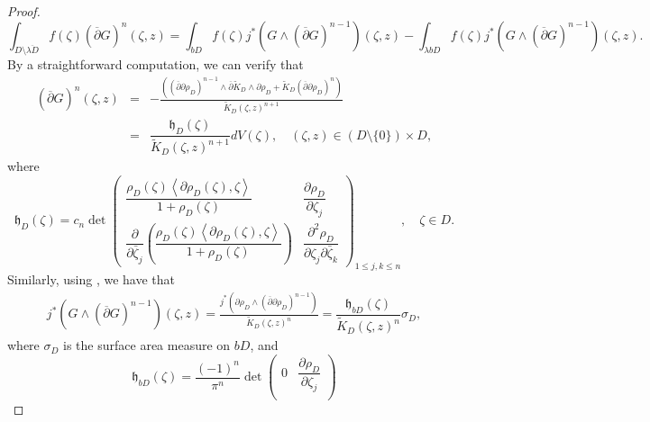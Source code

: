 \documentclass[11pt, oneside, reqno]{amsart}
\numberwithin{equation}{section}
\theoremstyle{definition}
\newcommand{\bes} {\begin{equation*}}
\newcommand{\ees} {\end{equation*}}
\newcommand{\be} {\begin{equation}}
\newcommand{\ee} {\end{equation}}
\newcommand{\bea} {\begin{eqnarray}}
\newcommand{\eea} {\end{eqnarray}}
\newcommand{\ltt}{\left(}
\newcommand{\rtt}{\right)}
\begin{document}
{\begin{proof}
\be\label{eq:int decomp}
\int_{ D\setminus \overline{\lambda D}}f(\zeta) \ltt \overline \partial G\rtt^n\ltt\zeta,z\rtt=\int_{b D} f(\zeta)j^*\ltt G\wedge\ltt\overline\partial G\rtt^{n-1}\rtt(\zeta,z)\minus\int_{\lambda b D}  f(\zeta)j^*\ltt G\wedge\ltt\overline\partial G\rtt^{n-1}\rtt(\zeta,z).
\ee
By a straightforward  computation, we can verify that 
 \bea\label{eq:comp vol}
 \ltt\overline\partial G\rtt^n(\zeta,z)
&=& 
-\frac{\ltt\ltt\overline\partial\partial\rho_D\rtt^{n-1}\wedge\overline{\partial}\widetilde K_ D\wedge\partial\rho_D+\widetilde K_ D\ltt\overline{\partial}\partial\rho_D\rtt^n\rtt}{\widetilde K_ D\ltt\zeta,z\rtt^{n+1}}\nonumber\\
&=&\dfrac{\mathfrak h_ D\ltt\zeta\rtt}{\widetilde K_ D\ltt\zeta,z\rtt^{n+1}}dV(\zeta),\quad \ltt\zeta,z\rtt\in\ltt D\setminus\{0\}\rtt\times D,
 \eea
 where
\bes
\renewcommand\arraystretch{2.5}
\mathfrak h_ D(\zeta)= c_n\det
\begin{pmatrix}
\dfrac{\rho_D(\zeta){\left\langle\partial\rho_D(\zeta),\zeta\right\rangle}}{1+\rho_D(\zeta)} & \dfrac{\partial\rho_D}{\partial \zeta_j}\\
    \dfrac{\partial}{\partial \bar \zeta_j}\ltt\dfrac{\rho_D(\zeta)\left\langle\partial\rho_D(\zeta),\zeta\right\rangle}{1+\rho_D(\zeta)}\rtt & 
    \dfrac{\partial^2\rho_D}{\partial \zeta_j\partial \bar \zeta_k}
\end{pmatrix}_{1\leq j,k\leq n}, \quad \zeta\in  D.
\ees
Similarly, using \cite[Lemma~3.4.]{Ra98}, we have that
\begin{align}\label{eq:leray surf area}
j^*\ltt G\wedge\ltt\overline\partial G\rtt^{n-1}\rtt(\zeta,z)
=\frac{j^*\ltt\partial \rho_D\wedge\ltt\overline\partial\partial\rho_D\rtt^{n-1}\rtt}{\widetilde{K}_ D\ltt\zeta,z\rtt^{n}}\nonumber=\dfrac{\mathfrak h_{bD}\ltt\zeta\rtt}{\widetilde{K}_ D\ltt\zeta,z\rtt^{n}}\sigma_ D,
\end{align}
where $\sigma_ D$ is the surface area measure on $b D$, and
\[
\mathfrak{h}_{b D}\ltt\zeta\rtt=\frac{(-1)^n}{\pi^n}\det\begin{pmatrix}
    0 & \dfrac{\partial\rho_D}{\partial \zeta_j}\\

\end{pmatrix}\]
\end{proof}}
\end{document}
